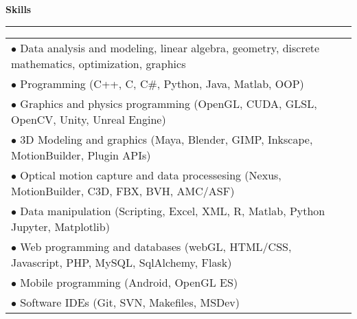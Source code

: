 {\large {\bf Skills}}
\vspace{0.1cm}
\hrule
\begin{tabular*}{7.1in}{@{}l@{\extracolsep\fill}r}
\noindent
$\bullet$ Data analysis and modeling, linear algebra, geometry, discrete mathematics, optimization, graphics\\
$\bullet$ Programming (C++, C, C\#, Python, Java, Matlab, OOP)\\
$\bullet$ Graphics and physics programming (OpenGL, CUDA, GLSL, OpenCV, Unity, Unreal Engine)\\
$\bullet$ 3D Modeling and graphics (Maya, Blender, GIMP, Inkscape, MotionBuilder, Plugin APIs)\\
$\bullet$ Optical motion capture and data processesing (Nexus, MotionBuilder, C3D, FBX, BVH, AMC/ASF)\\
$\bullet$ Data manipulation (Scripting, Excel, XML, R, Matlab, Python Jupyter, Matplotlib)\\
$\bullet$ Web programming and databases (webGL, HTML/CSS, Javascript, PHP, MySQL, SqlAlchemy, Flask)\\
$\bullet$ Mobile programming (Android, OpenGL ES)\\
$\bullet$ Software IDEs (Git, SVN, Makefiles, MSDev)\\
\end{tabular*}

